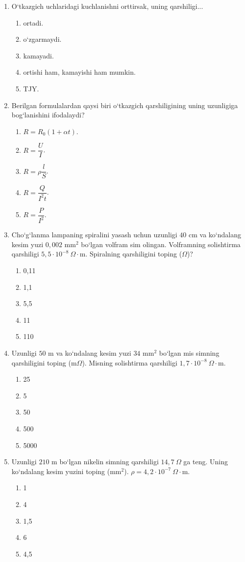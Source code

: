 \begin{enumerate}
\item O‘tkazgich uchlaridagi kuchlanishni orttirsak, uning qarshiligi...
\begin{enumerate}[label=\Alph*)]
\item ortadi.
\item o‘zgarmaydi.
\item kamayadi.
\item ortishi ham, kamayishi ham mumkin.
\item TJY.
\end{enumerate}

\item Berilgan formulalardan qaysi biri o‘tkazgich qarshiligining uning uzunligiga bog‘lanishini ifodalaydi?
\begin{enumerate}[label=\Alph*)]
\item $R=R_0(1+\alpha t)$.
\item $R=\dfrac{U}{I}$.
\item $R=\rho\dfrac{l}{S}$.
\item $R=\dfrac{Q}{I^2t}$.
\item $R=\dfrac{P}{I^2}$.
\end{enumerate}

\item Cho‘g‘lanma lampaning spiralini yasash uchun uzunligi $40$ cm va ko‘ndalang kesim yuzi $0,002$ mm$^2$ bo‘lgan volfram sim olingan. Volframning solishtirma qarshiligi $5,5\cdot10^{-8}~\Omega\cdot$m. Spiralning qarshiligini toping ($\Omega$)?
\begin{enumerate}[label=\Alph*)]
\item 0,11
\item 1,1
\item 5,5
\item 11
\item 110
\end{enumerate}

\item Uzunligi $50$ m va ko‘ndalang kesim yuzi $34$ mm$^2$ bo‘lgan mis simning qarshiligini toping (m$\Omega$). Misning solishtirma qarshiligi $1,7\cdot10^{-8}~\Omega\cdot$m.
\begin{enumerate}[label=\Alph*)]
\item 25
\item 5
\item 50
\item 500
\item 5000
\end{enumerate}

\item Uzunligi $210$ m bo‘lgan nikelin simning qarshiligi $14,7~\Omega$ ga teng. Uning ko‘ndalang kesim yuzini toping (mm$^2$). $\rho=4,2\cdot10^{-7}~\Omega\cdot$m.
\begin{enumerate}[label=\Alph*)]
\item 1
\item 4
\item 1,5
\item 6
\item 4,5
\end{enumerate}


\end{enumerate}
